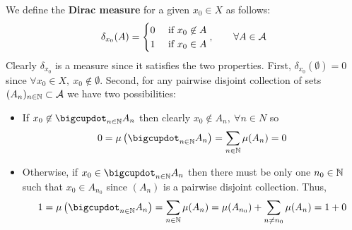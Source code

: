 \begin{eg}
	\label{eg:dirac-measure}
	We define the \textbf{Dirac measure} for a given $x_0 \in X$ as follows:
	\begin{align}
	\delta_{x_0}(A) = \begin{cases}
	0 &\text{ if } x_0\not\in A \\
	1 &\text{ if } x_0 \in A
	\end{cases},\qquad \forall A \in \mathcal{A}
	\end{align}
	Clearly $\delta_{x_0}$ is a measure since it satisfies the two properties. First, $\delta_{x_0}(\emptyset) = 0$ since $\forall x_0 \in X,\ x_0 \not\in \emptyset$. Second, for any pairwise disjoint collection of sets $(A_n)_{n\in\mathbb{N}} \subset \mathcal{A}$ we have two possibilities:
	\begin{itemize}
		\item If $x_0 \not\in \bigcupdot_{n \in \N} A_n$ then clearly $x_0 \not\in A_n,\ \forall n \in N$ so
		\begin{align*}
		0 = \mu\left(\bigcupdot_{n \in \N} A_n\right) = \sum_{n\in \N} \mu(A_n) = 0
		\end{align*}
		\item Otherwise, if $x_0 \in \bigcupdot_{n \in \N} A_n$ then there must be only one $n_0 \in \mathbb{N}$ such that $x_0 \in A_{n_0}$ since $(A_n)$ is a pairwise disjoint collection. Thus,
		\begin{align*}
		1 = \mu\left(\bigcupdot_{n \in \N} A_n\right) = \sum_{n\in \N} \mu(A_n) = \mu(A_{n_0}) + \sum_{n \neq n_0} \mu(A_n) = 1 + 0
		\end{align*}
	\end{itemize}
\end{eg}

